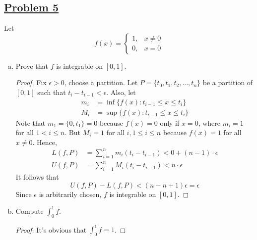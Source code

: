 \documentclass[10pt,letterpaper]{article}
\begin{document}
	\subsection*{{\color{purple}\underline{Problem 5}}}
	Let 
	$$f(x) = 
	\begin{cases}
		1, & x \neq 0 \\
		0, & x = 0
	\end{cases}
	$$
	\begin{enumerate}[(a)]
		\item Prove that $f$ is integrable on $[0, 1]$.
	\begin{proof}
	Fix $\epsilon > 0$, choose a partition. 
	Let $P = \{t_0, t_1, t_2, \ldots, t_n\}$ be a partition of $[0, 1]$ such that
	$t_i - t_{i-1} < \epsilon$. Also, let
\begin{align*}
	m_i &= \inf\{f(x): t_{i-1} \leq x \leq t_i\} \\
	M_i &= \sup\{f(x): t_{i-1} \leq x \leq t_i\} 
\end{align*}
	Note that $m_1 = \{0, t_1\} = 0$ because $f(x) = 0$ only if $x = 0$, where 
	$m_i = 1$ for all $1 < i \leq n$. But $M_i = 1$ for all $i, 1 \leq i \leq n$ because
	$f(x) = 1$ for all $x \neq 0$. Hence,
\begin{align*}
	L(f, P) &= \displaystyle\sum_{i=1}^{n} m_i(t_i - t_{i-1}) < 0 + (n - 1) \cdot \epsilon \\
	U(f, P) &= \displaystyle\sum_{i=1}^{n} M_i(t_i - t_{i-1}) < n \cdot \epsilon
\end{align*}
	It follows that
	$$U(f, P) - L(f, P) < (n - n + 1) \epsilon = \epsilon$$
	Since $\epsilon$ is arbitrarily chosen, $f$ is integrable on $[0, 1]$.
	\end{proof}
		\item Compute $\displaystyle\int_0^1 f$.
	\begin{proof}
		It's obvious that $\displaystyle\int_0^1 f = 1$.	
	\end{proof}		
	
	\end{enumerate}
	
\end{document}
